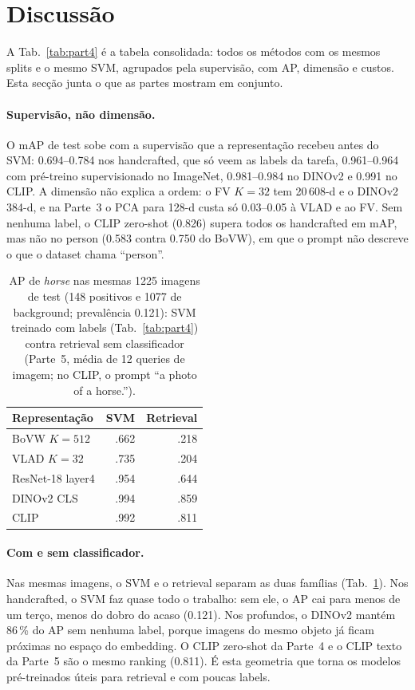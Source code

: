 \section{Discussão}
\label{sec:discussion}

A Tab.~\ref{tab:part4} é a tabela consolidada: todos os métodos com os mesmos
splits e o mesmo SVM, agrupados pela supervisão, com AP, dimensão e custos.
Esta secção junta o que as partes mostram em conjunto.

\paragraph{Supervisão, não dimensão.}
O mAP de test sobe com a supervisão que a representação recebeu antes do SVM:
0.694--0.784 nos handcrafted, que só veem as labels da tarefa, 0.961--0.964
com pré-treino supervisionado no ImageNet, 0.981--0.984 no DINOv2 e 0.991 no
CLIP. A dimensão não explica a ordem: o FV $K=32$ tem 20\,608-d e o DINOv2
384-d, e na Parte~3 o PCA para 128-d custa só 0.03--0.05 à VLAD e ao FV. Sem
nenhuma label, o CLIP zero-shot (0.826) supera todos os handcrafted em mAP,
mas não no person (0.583 contra 0.750 do BoVW), em que o prompt não descreve o
que o dataset chama ``person''.

\begin{table}[h]
\centering
\caption{AP de \emph{horse} nas mesmas 1225 imagens de test (148 positivos e
1077 de background; prevalência 0.121): SVM treinado com labels
(Tab.~\ref{tab:part4}) contra retrieval sem classificador (Parte~5, média de
12 queries de imagem; no CLIP, o prompt ``a photo of a horse.'').}
\label{tab:discussion}
\small
\begin{tabular}{lrr}
\toprule
Representação & SVM & Retrieval \\
\midrule
BoVW $K{=}512$   & .662 & .218 \\
VLAD $K{=}32$    & .735 & .204 \\
ResNet-18 layer4 & .954 & .644 \\
DINOv2 CLS       & .994 & .859 \\
CLIP             & .992 & .811 \\
\bottomrule
\end{tabular}
\end{table}

\paragraph{Com e sem classificador.}
Nas mesmas imagens, o SVM e o retrieval separam as duas famílias
(Tab.~\ref{tab:discussion}). Nos handcrafted, o SVM faz quase todo o
trabalho: sem ele, o AP cai para menos de um terço, menos do dobro do acaso
(0.121). Nos profundos, o DINOv2 mantém 86\,\% do AP sem nenhuma label, porque
imagens do mesmo objeto já ficam próximas no espaço do embedding. O CLIP
zero-shot da Parte~4 e o CLIP texto da Parte~5 são o mesmo ranking (0.811). É
esta geometria que torna os modelos pré-treinados úteis para retrieval e com
poucas labels.


